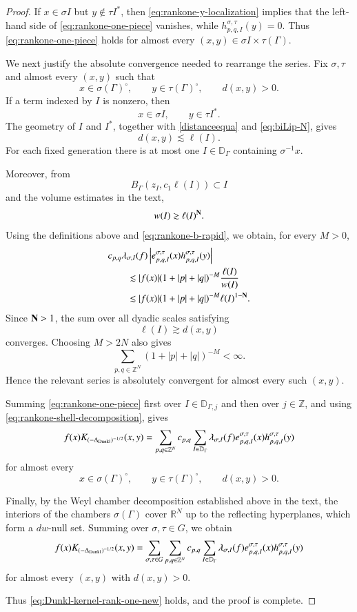 \documentclass[12pt]{amsart}
\begin{document}
\begin{proof}
If $x\in\sigma I$ but $y\notin\tau I^\ast$, then
\eqref{eq:rankone-y-localization} implies that the left-hand side of
\eqref{eq:rankone-one-piece} vanishes, while
$
h_{p,q,I}^{\sigma,\tau}(y)=0.
$
Thus \eqref{eq:rankone-one-piece} holds for almost every
$
(x,y)\in\sigma I\times\tau(\Gamma).
$

We next justify the absolute convergence needed to rearrange the
series. Fix $\sigma,\tau$ and almost every $(x,y)$ such that
\[
x\in\sigma(\Gamma)^\circ,
\qquad
y\in\tau(\Gamma)^\circ,
\qquad
d(x,y)>0.
\]
If a term indexed by $I$ is nonzero, then
\[
x\in\sigma I,
\qquad
y\in\tau I^\ast.
\]
The geometry of $I$ and $I^\ast$, together with
\eqref{distanceequa} and \eqref{eq:biLip-N}, gives
\[
d(x,y)\lesssim\ell(I).
\]
For each fixed generation there is at most one
$I\in\mathbb D_\Gamma$ containing $\sigma^{-1}x$.

Moreover, from
\[
B_\Gamma(z_I,c_1\ell(I))\subset I
\]
and the volume estimates in the text,
\[
w(I)
\gtrsim
\ell(I)^{\bf N}.
\]
Using the definitions above and
\eqref{eq:rankone-b-rapid}, we obtain, for every $M>0$,
\begin{align*}
&c_{p,q}\lambda_{\sigma,I}(f)
\left|
e_{p,q,I}^{\sigma,\tau}(x)
h_{p,q,I}^{\sigma,\tau}(y)
\right|
\\
&\qquad\lesssim
|f(x)|
(1+|p|+|q|)^{-M}
\frac{\ell(I)}{w(I)}
\\
&\qquad\lesssim
|f(x)|
(1+|p|+|q|)^{-M}
\ell(I)^{1-{\bf N}}.
\end{align*}
Since ${\bf N}>1$, the sum over all dyadic scales satisfying
\[
\ell(I)\gtrsim d(x,y)
\]
converges. Choosing $M>2N$ also gives
\[
\sum_{p,q\in\mathbb Z^N}
(1+|p|+|q|)^{-M}<\infty.
\]
Hence the relevant series is absolutely convergent for almost every
such $(x,y)$.

Summing \eqref{eq:rankone-one-piece} first over
$I\in\mathbb D_{\Gamma,j}$ and then over $j\in\mathbb Z$, and using
\eqref{eq:rankone-shell-decomposition}, gives
\[
f(x)K_{(-\Delta_{{\rm Dunkl}})^{-1/2}}(x,y)
=
\sum_{p,q\in\mathbb Z^N}
c_{p,q}
\sum_{I\in\mathbb D_\Gamma}
\lambda_{\sigma,I}(f)
e_{p,q,I}^{\sigma,\tau}(x)
h_{p,q,I}^{\sigma,\tau}(y)
\]
for almost every
\[
x\in\sigma(\Gamma)^\circ,
\qquad
y\in\tau(\Gamma)^\circ,
\qquad
d(x,y)>0.
\]

Finally, by the Weyl chamber decomposition established above in the
text, the interiors of the chambers $\sigma(\Gamma)$ cover
$\mathbb R^N$ up to the reflecting hyperplanes, which form a
$dw$-null set. Summing over $\sigma,\tau\in G$, we obtain
\[
f(x)K_{(-\Delta_{{\rm Dunkl}})^{-1/2}}(x,y)
=
\sum_{\sigma,\tau\in G}
\sum_{p,q\in\mathbb Z^N}
c_{p,q}
\sum_{I\in\mathbb D_\Gamma}
\lambda_{\sigma,I}(f)
e_{p,q,I}^{\sigma,\tau}(x)
h_{p,q,I}^{\sigma,\tau}(y)
\]
for almost every $(x,y)$ with $d(x,y)>0$.

Thus \eqref{eq:Dunkl-kernel-rank-one-new} holds, and the proof is
complete.
\end{proof}
\end{document}
